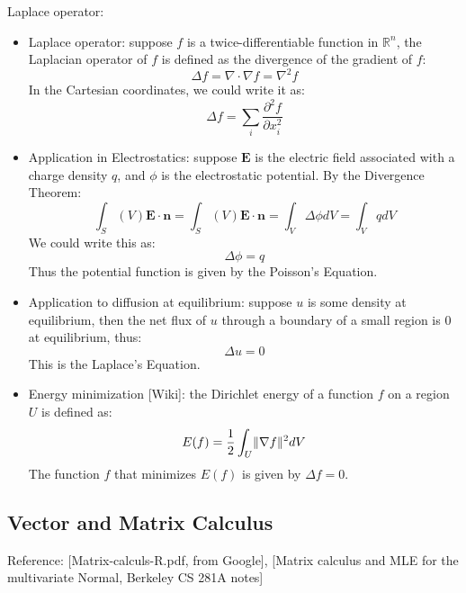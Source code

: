 \documentclass{report}
\begin{document}
Laplace operator: 
\begin{itemize}
\item Laplace operator: suppose $f$ is a twice-differentiable function in $\mathbb{R}^n$, the Laplacian operator of $f$ is defined as the divergence of the gradient of $f$: 
\begin{equation}
\Delta f = \nabla \cdot \nabla f = \nabla^2 f 
\end{equation}
In the Cartesian coordinates, we could write it as: 
\begin{equation}
\Delta f = \sum_i \frac{\partial^2 f}{\partial x_i^2}	
\end{equation}

\item Application in Electrostatics: suppose $\mathbf{E}$ is the electric field associated with a charge density $q$, and $\phi$ is the electrostatic potential. By the Divergence Theorem: 
\begin{equation}
\int_S(V) \mathbf{E} \cdot \mathbf{n}	= \int_S(V) \mathbf{E} \cdot \mathbf{n} = \int_V \Delta \phi dV = \int_V q dV
\end{equation}
We could write this as: 
\begin{equation}
\Delta \phi = q	
\end{equation}
Thus the potential function is given by the Poisson's Equation. 

\item Application to diffusion at equilibrium: suppose $u$ is some density at equilibrium, then the net flux of $u$ through a boundary of a small region is 0 at equilibrium, thus: 
\begin{equation}
\Delta u = 0	
\end{equation}
This is the Laplace's Equation. 

\item Energy minimization [Wiki]: the Dirichlet energy of a function $f$ on a region $U$ is defined as: 
\begin{equation}
E(f) = \frac{1}{2} \int_U \lVert\nabla f\rVert^2 dV	
\end{equation}
The function $f$ that minimizes $E(f)$ is given by $\Delta f = 0$. 
\end{itemize}
\subsection{Vector and Matrix Calculus} 

Reference: [Matrix-calculs-R.pdf, from Google], [Matrix calculus and MLE for the multivariate Normal, Berkeley CS 281A notes]
\end{document}
